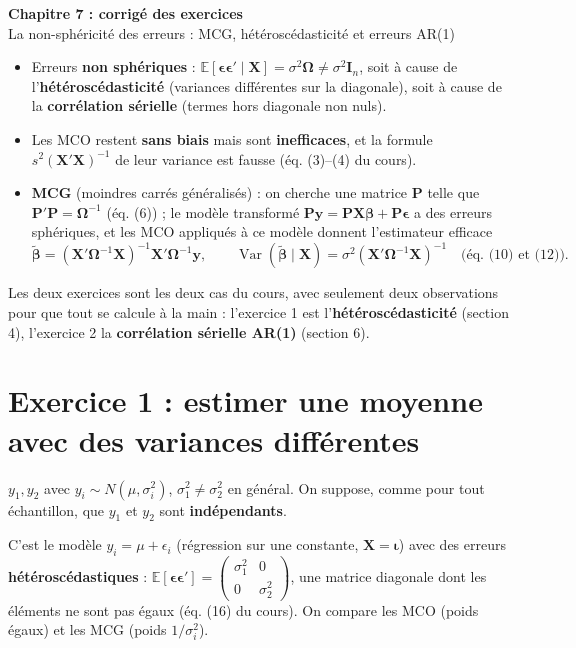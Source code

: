 \documentclass[11pt,a4paper]{article}
\newcommand{\vy}{\mathbf{y}}\newcommand{\vX}{\mathbf{X}}\newcommand{\vi}{\bm{\iota}}
\newcommand{\veps}{\bm{\epsilon}}\newcommand{\vu}{\mathbf{u}}\newcommand{\vbeta}{\bm{\beta}}
\newcommand{\I}{\mathbf{I}}\newcommand{\Pm}{\mathbf{P}}\newcommand{\Om}{\bm{\Omega}}
\newcommand{\E}{\mathbb{E}}\newcommand{\Var}{\operatorname{Var}}\newcommand{\Cov}{\operatorname{Cov}}
\begin{document}
\begin{center}
{\LARGE\bfseries Chapitre 7 : corrigé des exercices}\\[6pt]
{\large La non-sphéricité des erreurs : MCG, hétéroscédasticité et erreurs AR(1)}
\end{center}

\begin{tcolorbox}[colback=white,colframe=NavyBlue,title=Ce qu'il faut avoir en tête (rappels du cours)]
\begin{itemize}[nosep]
\item Erreurs \textbf{non sphériques} : $\E[\veps\veps'\mid\vX]=\sigma^2\Om\neq\sigma^2\I_n$, soit à cause de l'\textbf{hétéroscédasticité} (variances différentes sur la diagonale), soit à cause de la \textbf{corrélation sérielle} (termes hors diagonale non nuls).
\item Les MCO restent \textbf{sans biais} mais sont \textbf{inefficaces}, et la formule $s^2(\vX'\vX)^{-1}$ de leur variance est fausse (éq. (3)--(4) du cours).
\item \textbf{MCG} (moindres carrés généralisés) : on cherche une matrice $\Pm$ telle que $\Pm'\Pm=\Om^{-1}$ (éq. (6)) ; le modèle transformé $\Pm\vy=\Pm\vX\vbeta+\Pm\veps$ a des erreurs sphériques, et les MCO appliqués à ce modèle donnent l'estimateur efficace
\[
\tilde{\bm\beta}=(\vX'\Om^{-1}\vX)^{-1}\vX'\Om^{-1}\vy,\qquad \Var(\tilde{\bm\beta}\mid\vX)=\sigma^2(\vX'\Om^{-1}\vX)^{-1}\quad\text{(éq. (10) et (12))}.
\]
\end{itemize}
Les deux exercices sont les deux cas du cours, avec seulement deux observations pour que tout se calcule à la main : l'exercice 1 est l'\textbf{hétéroscédasticité} (section 4), l'exercice 2 la \textbf{corrélation sérielle AR(1)} (section 6).
\end{tcolorbox}

\tableofcontents

\section{Exercice 1 : estimer une moyenne avec des variances différentes}

$y_1,y_2$ avec $y_i\sim N(\mu,\sigma_i^2)$, $\sigma_1^2\neq\sigma_2^2$ en général. On suppose, comme pour tout échantillon, que $y_1$ et $y_2$ sont \textbf{indépendants}.

\begin{cours}
C'est le modèle $y_i=\mu+\epsilon_i$ (régression sur une constante, $\vX=\vi$) avec des erreurs \textbf{hétéroscédastiques} : $\E[\veps\veps']=\begin{pmatrix}\sigma_1^2&0\\0&\sigma_2^2\end{pmatrix}$, une matrice diagonale dont les éléments ne sont pas égaux (éq. (16) du cours). On compare les MCO (poids égaux) et les MCG (poids $1/\sigma_i^2$).
\end{cours}
\end{document}
